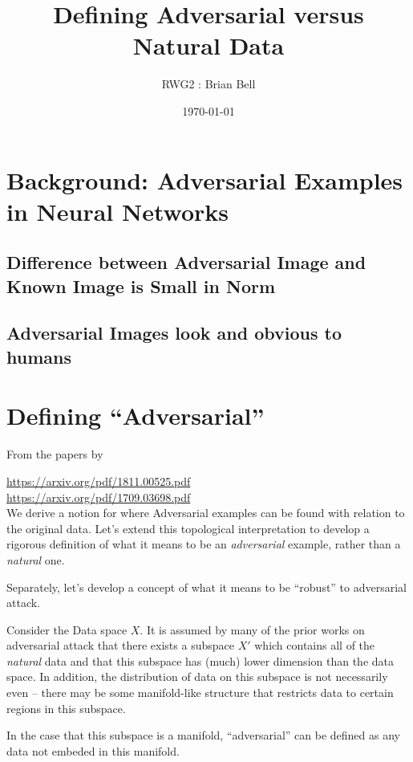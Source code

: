 \documentclass[10pt]{extarticle}\usepackage[letterpaper]{geometry}
\author{RWG2 : Brian Bell} %
\date{\today}
\title{Defining Adversarial versus Natural Data}
\begin{document}
\tableofcontents
\flushleft

\section{Background: Adversarial Examples in Neural Networks}
\subsection{Difference between Adversarial Image and Known Image is Small in Norm}
\subsection{Adversarial Images look and obvious to humans}

\section{Defining ``Adversarial''}

From the papers by 

\url{https://arxiv.org/pdf/1811.00525.pdf}\\
\url{https://arxiv.org/pdf/1709.03698.pdf}\\



We derive a notion for where Adversarial examples can be found with
relation to the original data. Let's extend this topological
interpretation to develop a rigorous definition of what it means to be
an \emph{adversarial} example, rather than a \emph{natural} one.\\
\vspace{.3cm}

Separately, let's develop a concept of what it means to be ``robust''
to adversarial attack. \\
\vspace{.3cm}

Consider the Data space $X$. It is assumed by many of the prior works
on adversarial attack that there exists a subspace $X'$ which contains
all of the \emph{natural} data and that this subspace has (much) lower
dimension than the data space. In addition, the distribution of data
on this subspace is not necessarily even -- there may be some
manifold-like structure that restricts data to certain regions in this
subspace. \\
\vspace{.3cm}

In the case that this subspace is a manifold, ``adversarial'' can be
defined as any data not embeded in this manifold.\\
\vspace{.3cm}
\end{document}
